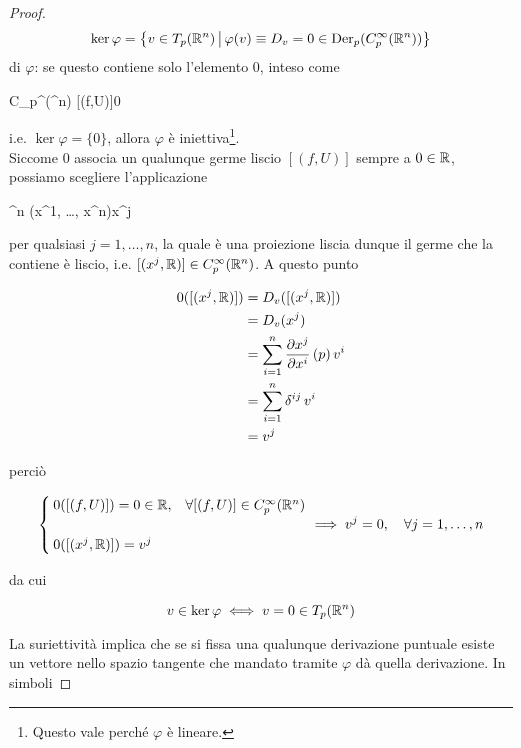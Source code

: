 \begin{proof}
{		\begin{equation*}
			\ker \varphi = \left\{ v \in T_{p}(\mathbb{R}^{n}) \, \middle| \, \varphi(v) \equiv D_{v} = 0 \in \operatorname{Der}_{p}(C_{p}^{\infty}(\mathbb{R}^{n})) \right\}
		\end{equation*}%
	} di $ \varphi $: se questo contiene solo l'elemento $ 0 $, inteso come
	
		{C_{p}^{\infty}(\R^{n})}{\R}
		{[(f,U)]}{0}

	i.e. $ \ker \varphi = \{0\} $, allora $ \varphi $ è iniettiva\footnote{
		Questo vale perché $ \varphi $ è lineare.%
	}. \\
	Siccome $ 0 $ associa un qualunque germe liscio $ [(f,U)] $ sempre a $ 0 \in \mathbb{R} $, possiamo scegliere l'applicazione
	
		{\R^{n}}{\R}
		{(x^{1}, \dots, x^{n})}{x^{j}}

	per qualsiasi $ j=1,\dots,n $, la quale è una proiezione liscia dunque il germe che la contiene è liscio, i.e. $ [(x^{j},\mathbb{R})] \in C_{p}^{\infty}(\mathbb{R}^{n}) $. A questo punto
	
	\begin{align}
		\begin{split}
			0([(x^{j},\mathbb{R})]) &= D_{v} ([(x^{j},\mathbb{R})]) \\
			&= D_{v} (x^{j}) \\
			&= \sum_{i=1}^{n} \pdv{x^{j}}{x^{i}} \, (p) \, v^{i} \\
			&= \sum_{i=1}^{n} \delta^{ij} \, v^{i} \\
			&= v^{j}
		\end{split}
	\end{align}

	perciò
	
	\begin{equation}
		\begin{cases}
			0([(f,U)]) = 0 \in \R, & \forall [(f,U)] \in C_{p}^{\infty}(\R^{n}) \\ \\
			0([(x^{j},\R)]) = v^{j}
		\end{cases}%
		 \implies v^{j} = 0 \qcomma \forall j=1,\dots,n
	\end{equation}
	
	da cui
	
	\begin{equation}
		v \in \ker \varphi \iff v = 0 \in T_{p}(\mathbb{R}^{n})
	\end{equation}

	La suriettività implica che se si fissa una qualunque derivazione puntuale esiste un vettore nello spazio tangente che mandato tramite $ \varphi $ dà quella derivazione. In simboli


\end{proof}
